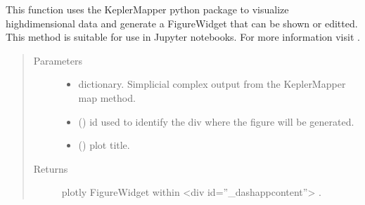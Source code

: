 \documentclass[letterpaper,10pt,english]{sphinxmanual}
\begin{document}
\begin{fulllineitems}
\label{\detokenize{_autosummary/analytics_core.viz:analytics_core.viz.viz.getMapperFigure}}
This function uses the KeplerMapper python package to visualize high\sphinxhyphen{}dimensional data and generate a FigureWidget that can be shown or editted.
This method is suitable for use in Jupyter notebooks. For more information visit .
\begin{quote}\begin{description}
\item[{Parameters}] \leavevmode\begin{itemize}
\item {} 
 \textendash{} dictionary. Simplicial complex output from the KeplerMapper map method.

\item {} 
 () \textendash{} id used to identify the div where the figure will be generated.

\item {} 
 () \textendash{} plot title.

\end{itemize}

\item[{Returns}] \leavevmode
plotly FigureWidget within \textless{}div id=”\_dash\sphinxhyphen{}app\sphinxhyphen{}content”\textgreater{} .

\end{description}\end{quote}

\end{fulllineitems}

\end{document}
